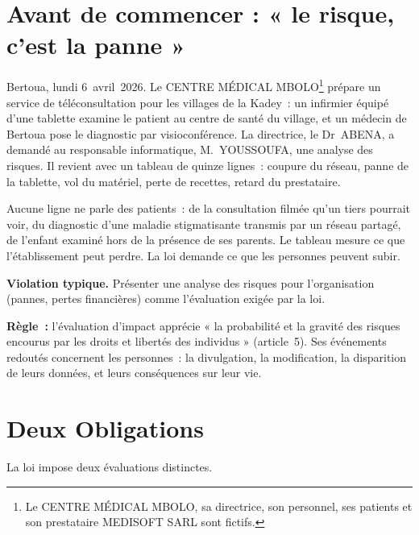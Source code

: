 \section*{Avant de commencer : « le risque, c'est la panne »}

Bertoua, lundi 6~avril~2026. Le CENTRE MÉDICAL MBOLO\footnote{Le CENTRE
MÉDICAL MBOLO, sa directrice, son personnel, ses patients et son prestataire
MEDISOFT SARL sont fictifs.} prépare un service de téléconsultation pour
les villages de la Kadey~: un infirmier équipé d'une tablette examine le
patient au centre de santé du village, et un médecin de Bertoua pose le
diagnostic par visioconférence. La directrice, le Dr~ABENA, a demandé au
responsable informatique, M.~YOUSSOUFA, une analyse des risques. Il revient
avec un tableau de quinze lignes~: coupure du réseau, panne de la tablette,
vol du matériel, perte de recettes, retard du prestataire.

Aucune ligne ne parle des patients~: de la consultation filmée qu'un tiers
pourrait voir, du diagnostic d'une maladie stigmatisante transmis par un
réseau partagé, de l'enfant examiné hors de la présence de ses parents. Le
tableau mesure ce que l'établissement peut perdre. La loi demande ce que
les personnes peuvent subir.

\begin{boxalert}
\textbf{Violation typique.} Présenter une analyse des risques pour
l'organisation (pannes, pertes financières) comme l'évaluation exigée par la
loi.

\smallskip
\textbf{Règle~:} l'évaluation d'impact apprécie « la probabilité et la
gravité des risques encourus par les droits et libertés des individus »
(article~5). Ses événements redoutés concernent les personnes~: la
divulgation, la modification, la disparition de leurs données, et leurs
conséquences sur leur vie.
\end{boxalert}

\section{Deux Obligations}
\label{sec:c05-obligations}

La loi impose deux évaluations distinctes.

